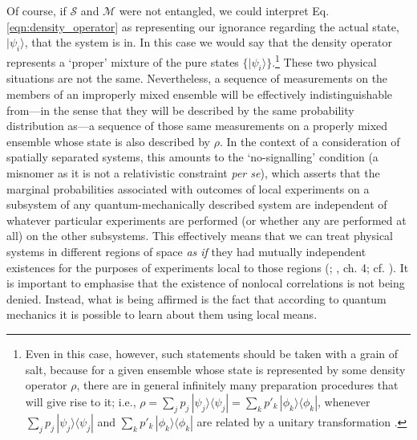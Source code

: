 \documentclass[12pt,english,twoside]{article}
\numberwithin{equation}{section}
\begin{document}
Of course, if $\mathcal{S}$ and $\mathcal{M}$ were not entangled, we could interpret Eq. \eqref{eqn:density_operator} as representing our ignorance regarding the actual state, $| \psi_i \rangle$, that the system is in. In this case we would say that the density operator represents a `proper' mixture of the pure states $\{| \psi_i \rangle\}$.\footnote{Even in this case, however, such statements should be taken with a grain of salt, because for a given ensemble whose state is represented by some density operator $\rho$, there are in general infinitely many preparation procedures that will give rise to it; i.e.,
  $\rho = \sum_j p_j \, | \psi_j \rangle \langle \psi_j | = \sum_k p'_k \, | \phi_k \rangle \langle \phi_k |$, whenever $\sum_j p_j \, | \psi_j \rangle \langle \psi_j |$ and $\sum_k p'_k \, | \phi_k \rangle \langle \phi_k |$ are related by a unitary transformation \citep[p. 103]{nielsenChuang2000}.} These two physical situations are not the same. Nevertheless, a sequence of measurements on the members of an improperly mixed ensemble will be effectively indistinguishable from---in the sense that they will be described by the same probability distribution as---a sequence of those same measurements on a properly mixed ensemble whose state is also described by $\rho$. In the context of a consideration of spatially separated systems, this amounts to the `no-signalling' condition (a misnomer as it is not a relativistic constraint \emph{per se}), which asserts that the marginal probabilities associated with outcomes of local experiments on a subsystem of any quantum-mechanically described system are independent of whatever particular experiments are performed (or whether any are performed at all) on the other subsystems. This effectively means that we can treat physical systems in different regions of space \emph{as if} they had mutually independent existences for the purposes of experiments local to those regions (\citealt{cuffaroInfCausality}; \citealt{demopoulosOnTheories}, ch. 4; cf. \citealt{wallace2010a}). It is important to emphasise that the existence of nonlocal correlations is not being denied. Instead, what is being affirmed is the fact that according to quantum mechanics it is possible to learn about them using local means.
\end{document}
